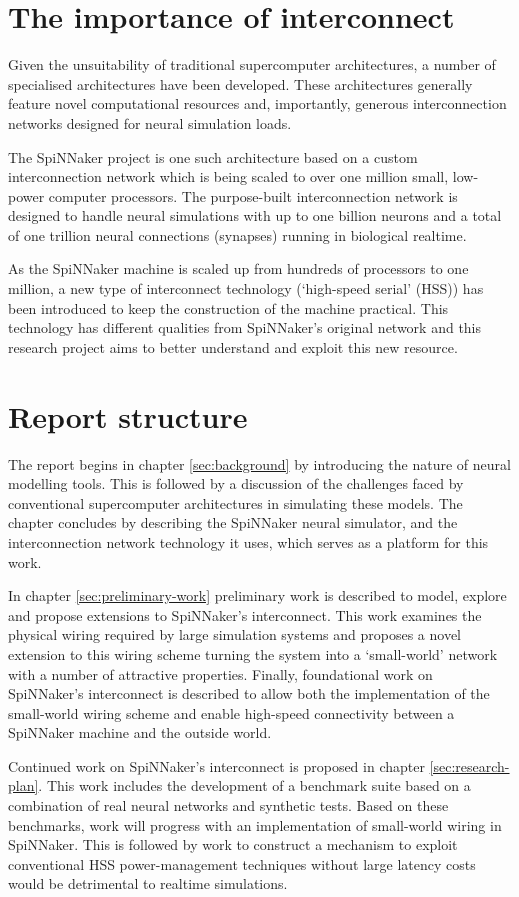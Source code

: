	\section{The importance of interconnect}
		
		Given the unsuitability of traditional supercomputer architectures, a number
		of specialised architectures have been developed. These architectures
		generally feature novel computational resources and, importantly, generous
		interconnection networks designed for neural simulation loads.
		
		The SpiNNaker project \cite{furber06} is one such architecture based on a
		custom interconnection network which is being scaled to over one million
		small, low-power computer processors. The purpose-built interconnection
		network is designed to handle neural simulations with up to one billion
		neurons and a total of one trillion neural connections (synapses) running in
		biological realtime.
		
		As the SpiNNaker machine is scaled up from hundreds of processors to one
		million, a new type of interconnect technology (`high-speed serial' (HSS))
		has been introduced to keep the construction of the machine practical. This
		technology has different qualities from SpiNNaker's original network and
		this research project aims to better understand and exploit this new
		resource.
		
		\section{Report structure}
			
			The report begins in chapter \ref{sec:background} by introducing the
			nature of neural modelling tools. This is followed by a discussion of the
			challenges faced by conventional supercomputer architectures in
			simulating these models. The chapter concludes by describing the SpiNNaker
			neural simulator, and the interconnection network technology it uses,
			which serves as a platform for this work.
			
			In chapter \ref{sec:preliminary-work} preliminary work is described to
			model, explore and propose extensions to SpiNNaker's interconnect. This
			work examines the physical wiring required by large simulation systems and
			proposes a novel extension to this wiring scheme turning the system into a
			`small-world' network with a number of attractive properties. Finally,
			foundational work on SpiNNaker's interconnect is described to allow both
			the implementation of the small-world wiring scheme and enable high-speed
			connectivity between a SpiNNaker machine and the outside world.
			
			Continued work on SpiNNaker's interconnect is proposed in chapter
			\ref{sec:research-plan}. This work includes the development of a benchmark
			suite based on a combination of real neural networks and synthetic tests.
			Based on these benchmarks, work will progress with an implementation of
			small-world wiring in SpiNNaker. This is followed by work to construct a
			mechanism to exploit conventional HSS power-management techniques without
			large latency costs would be detrimental to realtime simulations.
